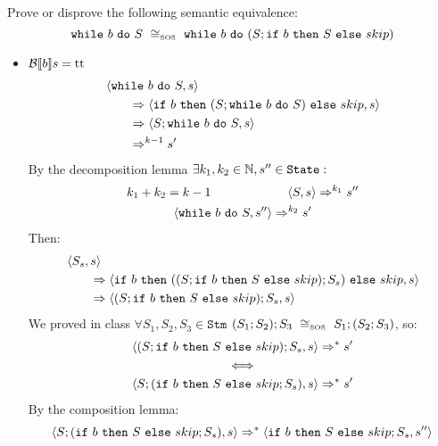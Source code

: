 \begin{exercise}{
    Prove or disprove the following semantic equivalence:
    \[ \wwhile{b}{S}\ \SOScong\ \wwhile{b}{(S;\wif{b}{S}{skip})} \]
}
\begin{itemize}
\begin{itemize}
\begin{itemize}
                        \item $\mathcal{B} \llbracket b \rrbracket s = \text{tt}$
                            \begin{align*}
                                &\left<\texttt{while}\ b\ \texttt{do}\ S, s\right>
                                \\&\qquad\Rightarrow \left<\texttt{if}\ b\ \texttt{then}\ (S; \texttt{while}\ b\ \texttt{do}\ S)\ \texttt{else}\ skip, s\right>
                                \\&\qquad\Rightarrow \left<S; \texttt{while}\ b\ \texttt{do}\ S, s\right>
                                \\&\qquad\Rightarrow^{k-1} s'
                            \end{align*}
                            By the decomposition lemma $\exists k_1, k_2 \in \mathbb{N}, s'' \in \texttt{State} :$
                            \begin{gather*}
                                k_1 + k_2 = k - 1 \qquad\qquad\qquad \left<S, s\right> \Rightarrow^{k_1} s'' \\
                                \left<\texttt{while}\ b\ \texttt{do}\ S, s''\right> \Rightarrow^{k_2} s'
                            \end{gather*}
                            Then:
                            \begin{align*}
                                &\left<S_s, s\right>
                                \\&\qquad\Rightarrow \left<\texttt{if}\ b\ \texttt{then}\ ((S;\texttt{if}\ b\ \texttt{then}\ S\ \texttt{else}\ skip);S_s)\ \texttt{else}\ skip, s\right>
                                \\&\qquad\Rightarrow \left<(S;\texttt{if}\ b\ \texttt{then}\ S\ \texttt{else}\ skip);S_s, s\right>
                            \end{align*}
                            We proved in class $\forall S_1, S_2, S_3 \in \texttt{Stm}$ $(S_1;S_2);S_3\ \SOScong\ S_1;(S_2;S_3)$, so:
                            \begin{gather*}
                                \left<(S;\texttt{if}\ b\ \texttt{then}\ S\ \texttt{else}\ skip);S_s, s\right> \Rightarrow^* s'
                                \\
                                \iff
                                \\
                                \left<S;(\texttt{if}\ b\ \texttt{then}\ S\ \texttt{else}\ skip;S_s), s\right> \Rightarrow^* s'
                            \end{gather*}
                            By the composition lemma:
                            \[
                                \left<S;(\texttt{if}\ b\ \texttt{then}\ S\ \texttt{else}\ skip;S_s), s\right>
                                \Rightarrow^*
                                \left<\texttt{if}\ b\ \texttt{then}\ S\ \texttt{else}\ skip;S_s, s''\right>
\]
\end{itemize}
\end{itemize}
\end{itemize}
\end{exercise}
